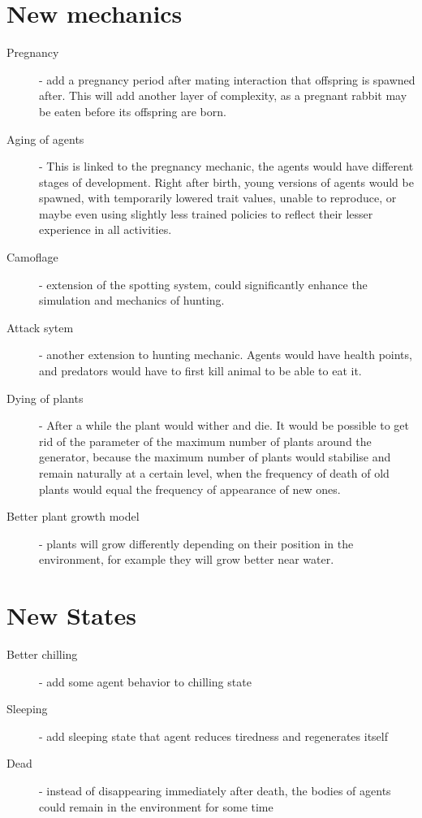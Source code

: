 \section{New mechanics}
\begin{description}
    \item[Pregnancy] - add a pregnancy period after mating interaction that offspring is spawned after. This will add another layer of complexity, as a pregnant rabbit may be eaten before its offspring are born.
    \item[Aging of agents] - This is linked to the pregnancy mechanic, the agents would have different stages of development. Right after birth, young versions of agents would be spawned, with temporarily lowered trait values, unable to reproduce, or maybe even using slightly less trained policies to reflect their lesser experience in all activities.
    \item[Camoflage] - extension of the spotting system, could significantly enhance the simulation and mechanics of hunting.
    \item[Attack sytem] - another extension to hunting mechanic. Agents would have health points, and predators would have to first kill animal to be able to eat it.
    \item[Dying of plants] - After a while the plant would wither and die. It would be possible to get rid of the parameter of the maximum number of plants around the generator, because the maximum number of plants would stabilise and remain naturally at a certain level, when the frequency of death of old plants would equal the frequency of appearance of new ones.
    \item[Better plant growth model] - plants will grow differently depending on their position in the environment, for example they will grow better near water.
\end{description}

\section{New States}
\begin{description}
    \item[Better chilling] - add some agent behavior to chilling state
    \item[Sleeping] - add sleeping state that agent reduces tiredness and regenerates itself
    \item[Dead] - instead of disappearing immediately after death, the bodies of agents could remain in the environment for some time
\end{description}

